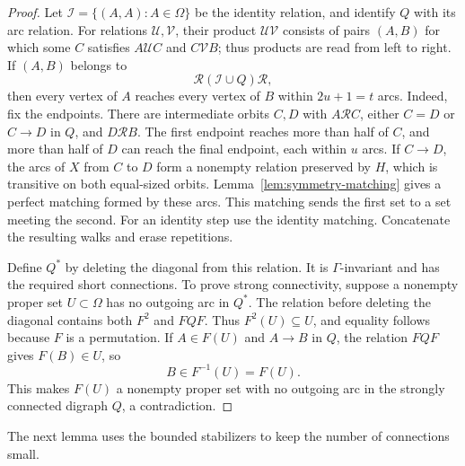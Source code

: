 \documentclass[11pt,a4paper,reqno]{amsart}
\theoremstyle{definition}
\theoremstyle{remark}
\numberwithin{equation}{section}
\begin{document}
\begin{proof}
Let $\mathcal I=\{(A,A):A\in\Omega\}$ be the identity relation, and identify $Q$ with its arc relation. For relations $\mathcal U,\mathcal V$, their product $\mathcal U\mathcal V$ consists of pairs $(A,B)$ for which some $C$ satisfies $A\mathcal U C$ and $C\mathcal V B$; thus products are read from left to right. If $(A,B)$ belongs to
\[
 \mathcal R(\mathcal I\cup Q)\mathcal R,
\]
then every vertex of $A$ reaches every vertex of $B$ within $2u+1=t$ arcs. Indeed, fix the endpoints. There are intermediate orbits $C,D$ with $A\mathcal R C$, either $C=D$ or $C\to D$ in $Q$, and $D\mathcal R B$. The first endpoint reaches more than half of $C$, and more than half of $D$ can reach the final endpoint, each within $u$ arcs. If $C\to D$, the arcs of $X$ from $C$ to $D$ form a nonempty relation preserved by $H$, which is transitive on both equal-sized orbits. Lemma~\ref{lem:symmetry-matching} gives a perfect matching formed by these arcs. This matching sends the first set to a set meeting the second. For an identity step use the identity matching. Concatenate the resulting walks and erase repetitions.

Define $Q^*$ by deleting the diagonal from this relation. It is $\Gamma$-invariant and has the required short connections. To prove strong connectivity, suppose a nonempty proper set $U\subset\Omega$ has no outgoing arc in $Q^*$. The relation before deleting the diagonal contains both $F^2$ and $FQF$. Thus $F^2(U)\subseteq U$, and equality follows because $F$ is a permutation. If $A\in F(U)$ and $A\to B$ in $Q$, the relation $FQF$ gives $F(B)\in U$, so
\[
 B\in F^{-1}(U)=F(U).
\]
This makes $F(U)$ a nonempty proper set with no outgoing arc in the strongly connected digraph $Q$, a contradiction.
\end{proof}

The next lemma uses the bounded stabilizers to keep the number of connections small.
\end{document}
